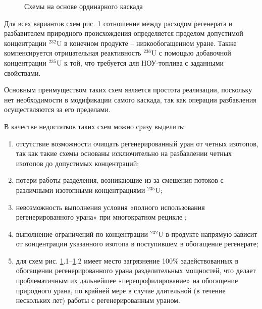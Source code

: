 \begin{figure}[ht]
  \caption{Схемы на основе ординарного каскада}\label{fig:diagram1}
\end{figure}

Для всех вариантов схем рис. \ref{fig:diagram1} сотношение между расходом регенерата и разбавителем природного происхождения определяется пределом допустимой концентрации $^{232}$U в конечном продукте -- низкообогащенном уране. Также компенсируется отрицательная реактивность $^{236}$U с помощью добавочной концентрации $^{235}$U к той, что требуется для НОУ-топлива с заданными свойствами.

Основным преимуществом таких схем является простота реализации, поскольку нет необходимости в модификации самого каскада, так как операции разбавления осуществляются за его пределами.

В качестве недостатков таких схем можно сразу выделить:
\begin{enumerate}
  \item отсутствие возможности очищать регенерированный уран от четных изотопов, так как такие схемы основаны исключительно на разбавлении четных изотопов до допустимых концентраций;
  \item потери работы разделения, возникающие из-за смешения потоков с различными изотопными концентрациями $^{235}$U;
  \item невозможность выполнения условия «полного использования регенерированного урана» при многократном рецикле \cite{smirnovApplyingEnrichmentCapacities2018};
  \item выполнение ограничений по концентрации $^{232}$U в продукте напрямую зависит от концентрации указанного изотопа в поступившем в обогащение регенерате;
  \item для схем рис. \ref{fig:diagram1}.1--\ref{fig:diagram1}.2 имеет место загрязнение 100\% задействованных в обогащении регенерированного урана разделительных мощностей, что делает проблематичным их дальнейшее «перепрофилирование» на обогащение природного урана, по крайней мере в случае длительной (в течение нескольких лет) работы с регенерированным ураном.
\end{enumerate}

